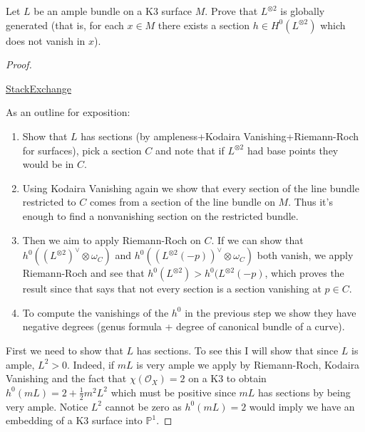\begin{exercise}
\label{exercise-l-ample-impli-lotim-globa}
Let $L$ be an ample bundle on a K3 surface
$M$.
Prove that $L^{\otimes 2}$ is
globally generated
(that is, for each $x \in M$ there exists a
section $h \in
H^{0}(L^{\otimes 2})$ which does not vanish
in $x$).
\end{exercise}

\begin{proof}
\begin{reference}
\href{https://math.stackexchange.com/%
questions/5081481/
ample-line-bundle-on-a-k3-surface-implies-l-
otimes-2-is-base-point-free/
5081492?noredirect=1#comment10928708_5081492}
{StackExchange}
\end{reference}
As an outline for exposition:
\begin{enumerate}
\item Show that $L$ has sections
(by ampleness+Kodaira Vanishing+Riemann-Roch
for surfaces),
pick a section $C$ and note that if
$L^{\otimes2}$ had base points they would be
in $C$.

\item  Using Kodaira Vanishing again we show
that every section of the line bundle
restricted to $C$
comes from a section of the line bundle on
$M$.
Thus it's enough to find a nonvanishing
section on the restricted bundle.

\item Then we aim to apply Riemann-Roch on
$C$.
If we can show that $h^0((L^{\otimes 2})^\vee
\otimes \omega_C)$
and $h^0((L^{\otimes 2}(-p))^\vee \otimes
\omega_C)$
both vanish, we apply Riemann-Roch and see
that
$h^0(L^{\otimes 2})> h^0(L^{\otimes 2}(-p)$,
which proves the result since that says
that not every section is a section vanishing
at $p \in C$.

\item To compute the vanishings of the $h^0$
in the previous step we show they have
negative degrees
(genus formula + degree of canonical bundle
of a curve).
\end{enumerate}

First we need to show that $L$ has sections.
To see this I will show that since $L$ is
ample, $L^2>0$. Indeed, if $mL$ is very ample
we apply by Riemann-Roch, Kodaira Vanishing
and the fact that $\chi(\mathcal{O}_X)=2$ on
a K3 to obtain $h^0(mL)=2+\frac{1}{2}m^2L^2$
which must be positive since $mL$ has
sections by being very ample. Notice $L^2$
cannot be zero as $h^0(mL)=2$ would imply we
have an embedding of a K3 surface into
$\mathbb{P}^1$.


\end{proof}

